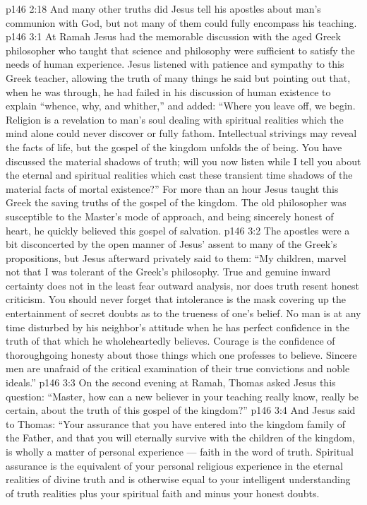 \vs p146 2:18 \pc And many other truths did Jesus tell his apostles about man’s communion with God, but not many of them could fully encompass his teaching.
\vs p146 3:1 At Ramah Jesus had the memorable discussion with the aged Greek philosopher who taught that science and philosophy were sufficient to satisfy the needs of human experience. Jesus listened with patience and sympathy to this Greek teacher, allowing the truth of many things he said but pointing out that, when he was through, he had failed in his discussion of human existence to explain \textcolor{ubdarkred}{“whence, why, and whither,”} and added: \textcolor{ubdarkred}{“Where you leave off, we begin. Religion is a revelation to man’s soul dealing with spiritual realities which the mind alone could never discover or fully fathom. Intellectual strivings may reveal the facts of life, but the gospel of the kingdom unfolds the  of being. You have discussed the material shadows of truth; will you now listen while I tell you about the eternal and spiritual realities which cast these transient time shadows of the material facts of mortal existence?”} For more than an hour Jesus taught this Greek the saving truths of the gospel of the kingdom. The old philosopher was susceptible to the Master’s mode of approach, and being sincerely honest of heart, he quickly believed this gospel of salvation.
\vs p146 3:2 The apostles were a bit disconcerted by the open manner of Jesus’ assent to many of the Greek’s propositions, but Jesus afterward privately said to them: \textcolor{ubdarkred}{“My children, marvel not that I was tolerant of the Greek’s philosophy. True and genuine inward certainty does not in the least fear outward analysis, nor does truth resent honest criticism. You should never forget that intolerance is the mask covering up the entertainment of secret doubts as to the trueness of one’s belief. No man is at any time disturbed by his neighbor’s attitude when he has perfect confidence in the truth of that which he wholeheartedly believes. Courage is the confidence of thoroughgoing honesty about those things which one professes to believe. Sincere men are unafraid of the critical examination of their true convictions and noble ideals.”}
\vs p146 3:3 \pc On the second evening at Ramah, Thomas asked Jesus this question: “Master, how can a new believer in your teaching really know, really be certain, about the truth of this gospel of the kingdom?”
\vs p146 3:4 And Jesus said to Thomas: \textcolor{ubdarkred}{“Your assurance that you have entered into the kingdom family of the Father, and that you will eternally survive with the children of the kingdom, is wholly a matter of personal experience --- faith in the word of truth. Spiritual assurance is the equivalent of your personal religious experience in the eternal realities of divine truth and is otherwise equal to your intelligent understanding of truth realities plus your spiritual faith and minus your honest doubts.}
